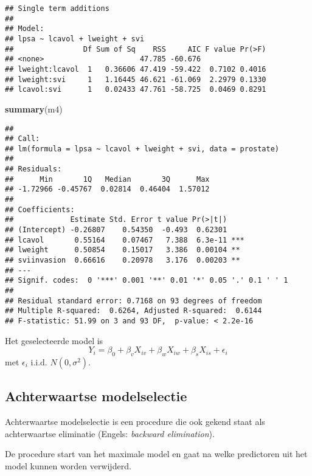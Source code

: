 \documentclass[12pt,dutch,coursenotes]{book}
\newenvironment{Shaded}{\begin{snugshade}}{\end{snugshade}}
\newcommand{\KeywordTok}[1]{\textcolor[rgb]{0.13,0.29,0.53}{\textbf{#1}}}
\newcommand{\NormalTok}[1]{#1}
\theoremstyle{definition}
\theoremstyle{definition}
\theoremstyle{definition}
\theoremstyle{remark}
\begin{document}
\begin{verbatim}
## Single term additions
## 
## Model:
## lpsa ~ lcavol + lweight + svi
##                Df Sum of Sq    RSS     AIC F value Pr(>F)
## <none>                      47.785 -60.676               
## lweight:lcavol  1   0.36606 47.419 -59.422  0.7102 0.4016
## lweight:svi     1   1.16445 46.621 -61.069  2.2979 0.1330
## lcavol:svi      1   0.02433 47.761 -58.725  0.0469 0.8291
\end{verbatim}

\begin{Shaded}
\begin{Highlighting}[]
\KeywordTok{summary}\NormalTok{(m4)}
\end{Highlighting}
\end{Shaded}

\begin{verbatim}
## 
## Call:
## lm(formula = lpsa ~ lcavol + lweight + svi, data = prostate)
## 
## Residuals:
##      Min       1Q   Median       3Q      Max 
## -1.72966 -0.45767  0.02814  0.46404  1.57012 
## 
## Coefficients:
##             Estimate Std. Error t value Pr(>|t|)    
## (Intercept) -0.26807    0.54350  -0.493  0.62301    
## lcavol       0.55164    0.07467   7.388  6.3e-11 ***
## lweight      0.50854    0.15017   3.386  0.00104 ** 
## sviinvasion  0.66616    0.20978   3.176  0.00203 ** 
## ---
## Signif. codes:  0 '***' 0.001 '**' 0.01 '*' 0.05 '.' 0.1 ' ' 1
## 
## Residual standard error: 0.7168 on 93 degrees of freedom
## Multiple R-squared:  0.6264, Adjusted R-squared:  0.6144 
## F-statistic: 51.99 on 3 and 93 DF,  p-value: < 2.2e-16
\end{verbatim}

Het geselecteerde model is \[
  Y_i  = \beta_0 + \beta_v X_{iv} + \beta_w X_{iw} + \beta_s X_{is} + \epsilon_i
\] met \(\epsilon_i \text{ i.i.d. } N(0,\sigma^2)\).

\subsection{Achterwaartse
modelselectie}\label{achterwaartse-modelselectie}

Achterwaartse modelselectie is een procedure die ook gekend staat als
achterwaartse eliminatie (Engels: \emph{backward elimination}).

De procedure start van het maximale model en gaat na welke predictoren
uit het model kunnen worden verwijderd.
\end{document}
